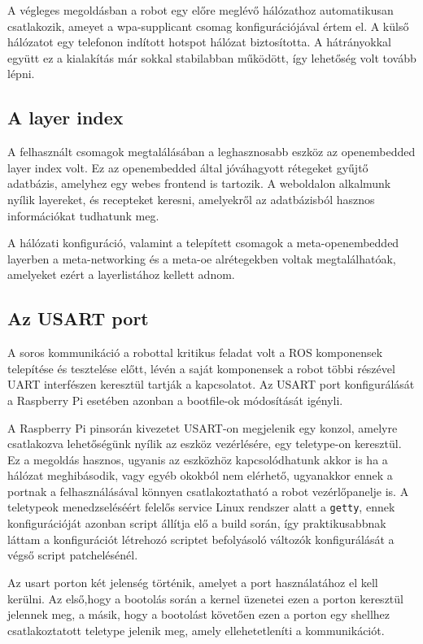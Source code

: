 \medskip

A végleges megoldásban a robot egy előre meglévő hálózathoz automatikusan
csatlakozik, ameyet a wpa-supplicant csomag konfigurációjával értem el. A külső
hálózatot egy telefonon indított hotspot hálózat biztosította. A hátrányokkal
együtt ez a kialakítás már sokkal stabilabban működött, így lehetőség volt tovább
lépni.

\medskip

\subsection{A layer index}

A felhasznált csomagok megtalálásában a leghasznosabb eszköz az
openembedded layer index volt. Ez az openembedded által jóváhagyott rétegeket
gyűjtő adatbázis, amelyhez egy webes frontend is tartozik. A weboldalon alkalmunk
nyílik layereket, és recepteket keresni, amelyekről az adatbázisból hasznos
információkat tudhatunk meg.~\cite{openembeddedidx}

A hálózati konfiguráció, valamint a telepített csomagok a meta-openembedded
layerben a meta-networking és a meta-oe alrétegekben voltak megtalálhatóak,
amelyeket ezért a layerlistához kellett adnom.

\subsection{Az USART port}

A soros kommunikáció a robottal kritikus feladat volt a ROS komponensek
telepítése és tesztelése előtt, lévén a saját komponensek a robot többi részével
UART interfészen keresztül tartják a kapcsolatot. Az USART port konfigurálását a
Raspberry Pi esetében azonban a bootfile-ok módosítását igényli.

A Raspberry Pi pinsorán kivezetet USART-on megjelenik egy konzol, amelyre
csatlakozva lehetőségünk nyílik az eszköz vezérlésére, egy teletype-on
keresztül. Ez a megoldás hasznos, ugyanis az eszközhöz kapcsolódhatunk akkor is
ha a hálózat meghibásodik, vagy egyéb okokból nem elérhető, ugyanakkor ennek a
portnak a felhasználásával könnyen csatlakoztatható a robot vezérlőpanelje is.  A
teletypeok menedzseléséért felelős service Linux rendszer alatt a \verb|getty|,
ennek konfigurációját azonban script állítja elő a build során, így
praktikusabbnak láttam a konfigurációt létrehozó scriptet befolyásoló változók
konfigurálását a végső script patchelésénél.

Az usart porton két jelenség történik, amelyet a port használatához el kell
kerülni. Az első,hogy a bootolás során a kernel üzenetei ezen a porton keresztül
jelennek meg, a másik, hogy a bootolást követően ezen a porton egy shellhez
csatlakoztatott teletype jelenik meg, amely ellehetetleníti a kommunikációt.

